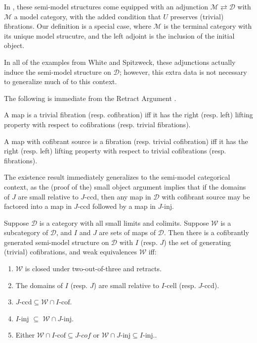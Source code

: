 \documentclass[a4paper,10pt
,draft
]{article}%
\renewcommand{\1}{\eta}%
\begin{document}
\begin{remark}
      In \cite{Spi01,Wh16}, these semi-model structures come equipped with an adjunction $\mathcal M \rightleftarrows \mathcal D$ with $\mathcal M$ a model category,
      with the added condition that $U$ preserves (trivial) fibrations.
      Our definition is a special case, where $\mathcal M$ is the terminal category with its unique model strucutre,
      and the left adjoint is the inclusion of the initial object.

      In all of the examples from White and Spitzweck, these adjunctions actually induce the semi-model structure on $\mathcal D$;
      however, this extra data is not necessary to generalize much of \cite{Hov99} to this context.
\end{remark}

The following is immediate from the Retract Argument \cite[Lemma 1.1.9]{Hov99}.
\begin{lemma}
      A map is a trivial fibration (resp. cofibration) iff it has the right (resp. left) lifting property with respect to cofibrations (resp. trivial fibrations).
      
      A map with cofibrant source is a fibration (resp. trivial cofibration) iff it has the right (resp. left) lifting property with respect to trivial cofibrations (resp. fibrations).
\end{lemma}

The existence result \cite[Theorem 2.1.19]{Hov99} immediately generalizes to the semi-model categorical context,
as the (proof of the) small object argument \cite[Lemma 2.1.14]{Hov99} implies that
if the domains of $J$ are small relative to $J$-ccd,
then any map in $\mathcal D$ with cofibrant source may be factored into a map in $J$-ccd followed by a map in $J$-inj.
\begin{theorem}
      \label{SEMIMS_THM}
      Suppose $\mathcal D$ is a category with all small limits and colimits.
      Suppose $\mathcal W$ is a subcategory of $\mathcal D$, and $I$ and $J$ are sets of maps of $\mathcal D$.
      Then there is a cofibrantly generated semi-model structure on $\mathcal D$ with
      $I$ (resp. $J$) the set of generating (trivial) cofibrations, and weak equivalences $\mathcal W$ iff:
      \begin{enumerate}[label = (\roman*)]
      \item $\mathcal W$ is closed under two-out-of-three and retracts.
      \item The domains of $I$ (resp. $J$) are small relative to $I$-cell (resp. $J$-ccd).
      \item $J\text{-ccd} \subseteq \mathcal W \cap I\text{-cof}$.
      \item $I$-inj $\subseteq$ $\mathcal W \cap J$-inj.
      \item Either $\mathcal W \cap I\text{-cof} \subseteq J\textit{-cof}$ or $\mathcal W \cap J\text{-inj} \subseteq I\text{-inj}.$.
      \end{enumerate}
\end{theorem}







\newpage
{} %

\end{document}
